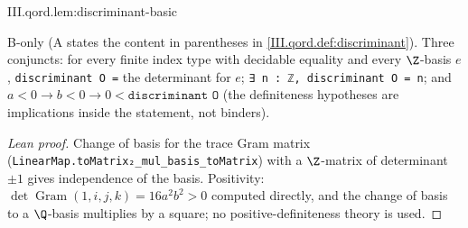 \begin{lemma}
\bonly
{}
\end{lemma}
\begin{tfformal}{III.qord.lem:discriminant-basic}
\begin{tffidelity}
B-only (A states the content in parentheses in \cref{III.qord.def:discriminant}). Three conjuncts: for every finite index type with decidable equality and every $\Z$-basis $e$, \texttt{discriminant O =} the determinant for $e$; \texttt{∃ n : ℤ, discriminant O = n}; and $a<0\to b<0\to0<\texttt{discriminant O}$ (the definiteness hypotheses are implications inside the statement, not binders).
\end{tffidelity}
\end{tfformal}
\begin{proof}[Lean proof]
Change of basis for the trace Gram matrix (\texttt{LinearMap.toMatrix₂\_mul\_basis\_toMatrix}) with a $\Z$-matrix of determinant $\pm1$ gives independence of the basis. Positivity: $\det\operatorname{Gram}(1,i,j,k)=16a^2b^2>0$ computed directly, and the change of basis to a $\Q$-basis multiplies by a square; no positive-definiteness theory is used.
\end{proof}

